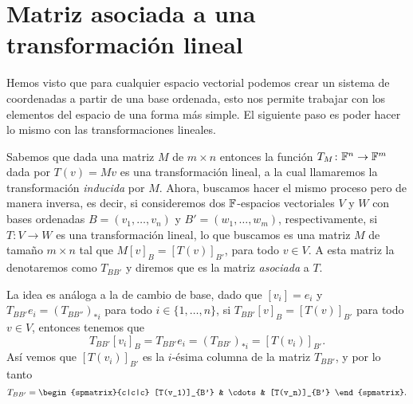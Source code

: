 \section{Matriz asociada a una transformación lineal}

Hemos visto que para cualquier espacio vectorial podemos crear un sistema de coordenadas a partir de una base ordenada, esto nos permite trabajar con los elementos del espacio de una forma más simple. El siguiente paso es poder hacer lo mismo con las transformaciones lineales.

Sabemos que dada una matriz $M$ de $m \times n$ entonces la función $T_M \colon \mathbb{F}^n \to \mathbb{F}^m$ dada por $T(v) = Mv$  es una transformación lineal, a la cual llamaremos la transformación \emph{inducida} por $M$. Ahora, buscamos hacer el mismo proceso pero de manera inversa, es decir, si consideremos dos $\mathbb{F}$-espacios vectoriales $V$ y $W$ con bases ordenadas $B = (v_1,\ldots,v_n)$ y $B' = (w_1,\ldots,w_m)$, respectivamente, si $T\colon V \to W$ es una transformación lineal, lo que buscamos es una matriz $M$ de tamaño $m\times n$ tal que $M[v]_B = [T(v)]_{B'}$, para todo $v \in V$. A esta matriz la denotaremos como $T_{BB'}$ y diremos que es la matriz \emph{asociada} a $T$.

La idea es análoga a la de cambio de base, dado que $[v_i] = e_i$ y $T_{BB'}e_i = (T_{BB''})_{*i}$ para todo $i \in \{1,\ldots,n\}$, si $T_{BB'}[v]_B = [T(v)]_{B'}$ para todo $v \in V$, entonces tenemos que
  \[ T_{BB'} [v_i]_B = T_{BB'} e_i = (T_{BB'})_{*i} = [T(v_i)]_{B'}. \]
Así vemos que $[T(v_i)]_{B'}$ es la $i$-ésima columna de la matriz $T_{BB'}$, y por lo tanto
  \[ T_{BB'} = \begin{spmatrix}{c|c|c}  [T(v_1)]_{B'} & \cdots & [T(v_n)]_{B'}  \end{spmatrix}. \]

